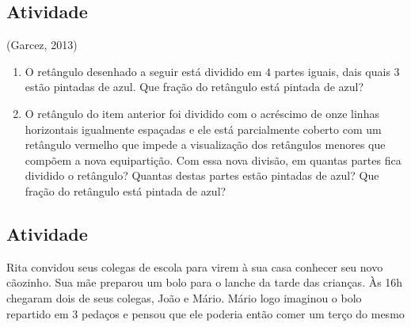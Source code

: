 \subsection{Atividade}

(Garcez, 2013)

\begin{enumerate} [\quad a)] %
  \item     O retângulo desenhado a seguir está dividido em     $4$ partes iguais, dais quais     $3$ estão pintadas de azul. Que fração do retângulo está pintada de azul?       
  \begin{center}
\end{center}

\item     O retângulo do item anterior foi dividido com o acréscimo de onze linhas horizontais igualmente espaçadas e ele está parcialmente coberto com um retângulo vermelho que impede a visualização dos retângulos menores que compõem a nova equipartição. Com essa nova divisão, em quantas partes fica dividido o retângulo? Quantas destas partes estão pintadas de azul? Que fração do retângulo está pintada de azul?     \mbox{} \newline      
\end{enumerate} %

\begin{center}
\end{center}

\subsection{Atividade}
Rita convidou seus colegas de escola para virem à sua casa conhecer seu novo cãozinho. Sua mãe preparou um bolo para o lanche da tarde das crianças. Às 16h chegaram dois de seus colegas, João e Mário. Mário logo imaginou o bolo repartido em 3 pedaços e pensou que ele poderia então comer um terço do mesmo 

